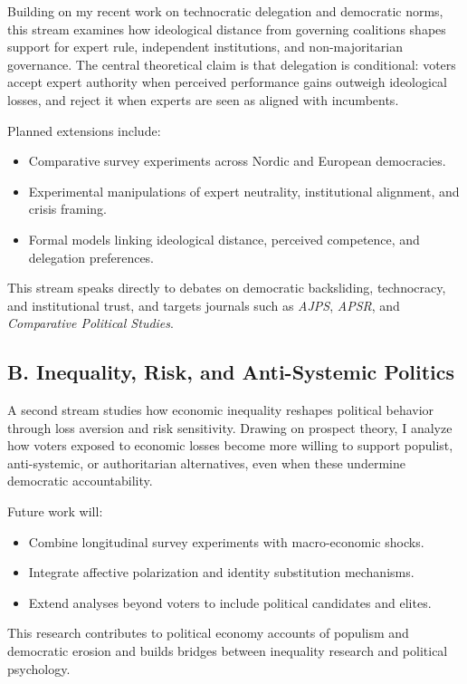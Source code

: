 \documentclass[letterpaper,11pt]{article}
\begin{document}
Building on my recent work on technocratic delegation and democratic norms, this stream examines how ideological distance from governing coalitions shapes support for expert rule, independent institutions, and non-majoritarian governance. The central theoretical claim is that delegation is conditional: voters accept expert authority when perceived performance gains outweigh ideological losses, and reject it when experts are seen as aligned with incumbents.

Planned extensions include:
\begin{itemize}
  \item Comparative survey experiments across Nordic and European democracies.
  \item Experimental manipulations of expert neutrality, institutional alignment, and crisis framing.
  \item Formal models linking ideological distance, perceived competence, and delegation preferences.
\end{itemize}

This stream speaks directly to debates on democratic backsliding, technocracy, and institutional trust, and targets journals such as \emph{AJPS}, \emph{APSR}, and \emph{Comparative Political Studies}.

\subsection*{B. Inequality, Risk, and Anti-Systemic Politics}

A second stream studies how economic inequality reshapes political behavior through loss aversion and risk sensitivity. Drawing on prospect theory, I analyze how voters exposed to economic losses become more willing to support populist, anti-systemic, or authoritarian alternatives, even when these undermine democratic accountability.

Future work will:
\begin{itemize}
  \item Combine longitudinal survey experiments with macro-economic shocks.
  \item Integrate affective polarization and identity substitution mechanisms.
  \item Extend analyses beyond voters to include political candidates and elites.
\end{itemize}

This research contributes to political economy accounts of populism and democratic erosion and builds bridges between inequality research and political psychology.
\end{document}
